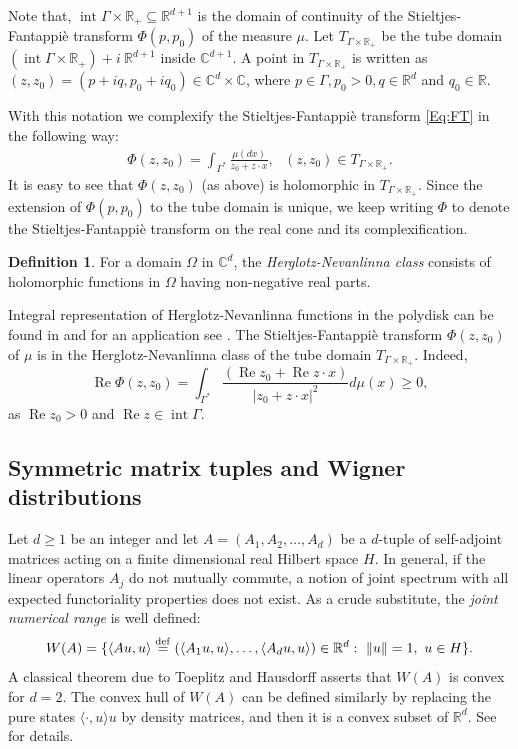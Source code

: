 \documentclass[11pt,reqno]{amsart}
\theoremstyle{plain}
\theoremstyle{definition}
\newtheorem{definition}[theorem]{Definition}
\numberwithin{equation}{section}
\newcommand{\bydef}{\stackrel{\rm def}{=}}
\begin{document}
	Note that, $\operatorname{int} \Gamma \times \mathbb{R}_+ \subseteq \mathbb{R}^{d+1}$ is the domain of continuity of the Stieltjes-Fantappi\`e transform $\Phi(p, p_0)$ of the measure $\mu$. 
    Let $T_{\Gamma \times \mathbb{R}_+}$ be the tube domain $(\operatorname{int} \Gamma \times \mathbb{R}_+) + i\ \mathbb{R}^{d+1}$ inside $\mathbb{C}^{d+1}$. A point in $T_{\Gamma \times \mathbb{R}_+}$ is written as $(z, z_0) = (p + i q, p_0 + i q_0) \in \mathbb{C}^d \times \mathbb{C}$, where $p \in \Gamma, p_0>0, q\in \mathbb{R}^d$ and $q_0 \in \mathbb{R}$. 
    
    With this notation we complexify the Stieltjes-Fantappi\`e transform \eqref{Eq:FT} in the following way:
	\begin{align} \label{Eq:complex-FT}
		\Phi(z, z_0) = \int_{\Gamma^*} \frac{\mu(dx)}{z_0 + z\cdot x}, \ \ \ (z, z_0)\in T_{\Gamma \times \mathbb{R}_+}.
	\end{align}
    It is easy to see that $\Phi(z, z_0)$ (as above) is holomorphic in $T_{\Gamma \times \mathbb{R}_+}.$
Since the extension of $\Phi(p, p_0)$ to the tube domain is unique, we keep writing $\Phi$ to denote the Stieltjes-Fantappi\`e transform on the real cone and its complexification.

    
\begin{definition}
For a domain $\Omega$ in $\mathbb{C}^d$, the {\em Herglotz-Nevanlinna class} consists of holomorphic functions in $\Omega$ having non-negative real parts. 
\end{definition}

Integral representation of Herglotz-Nevanlinna functions in the polydisk can be found in \cite{KP} and for an application see \cite{BP, BP2}. The Stieltjes-Fantappi\`e transform $\Phi(z, z_0)$ of $\mu$ is in the Herglotz-Nevanlinna class of the tube domain $T_{\Gamma \times \mathbb{R}_+}$. Indeed, 
$$
\operatorname{Re} \Phi(z, z_0) = \int_{\Gamma^*} \frac{(\operatorname{Re} z_0 + \operatorname{Re} z \cdot x)}{|z_0 + z\cdot x|^2} d\mu(x) \geq 0,
$$
as $\operatorname{Re} z_0 >0$ and $\operatorname{Re} z \in \operatorname{int} \Gamma$.

\subsection{Symmetric matrix tuples and Wigner distributions} \label{Sub:Wigner}
Let $d \geq 1$ be an integer and let $A = (A_1, A_2, \ldots, A _d)$ be a $d$-tuple of self-adjoint matrices acting on a finite dimensional real Hilbert space $H$.
In general, if the linear operators $A_j$ do not mutually commute, a notion of joint spectrum with all expected functoriality properties does not exist. As a crude substitute, the {\it joint numerical range} is well defined:
$$ W(A) = \{\langle Au, u \rangle \bydef (\langle A_1 u,u\rangle, \ldots, \langle A_d u, u \rangle) \in \mathbb{R}^d : \ \| u \| =1, \ u\in H \}.$$
A classical theorem due to Toeplitz and Hausdorff  asserts that $W(A)$ is convex for $d=2$. The convex hull of $W(A)$ can be defined similarly by replacing the pure states $\langle \cdot, u \rangle u$ by density matrices, and then it is a convex subset of ${\mathbb R}^d$. See \cite{PSW} for details.
\end{document}
